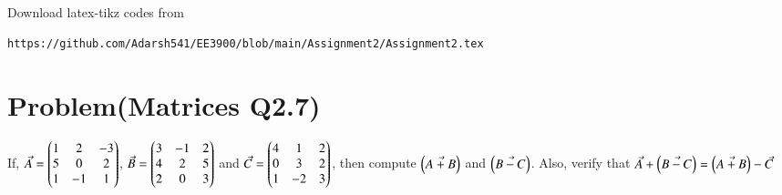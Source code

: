 \documentclass[journal,12pt,twocolumn]{IEEEtran}
\begin{document}
%
Download latex-tikz codes from 
%
\begin{lstlisting}
https://github.com/Adarsh541/EE3900/blob/main/Assignment2/Assignment2.tex
\end{lstlisting}
\section{Problem(Matrices Q2.7)}
If, $\Vec{A}=\begin{pmatrix}1&2&-3\\5&0&2\\1&-1&1\end{pmatrix}$, $\Vec{B}=\begin{pmatrix}3&-1&2\\4&2&5\\2&0&3\end{pmatrix}$ and $\Vec{C}=\begin{pmatrix}4&1&2\\0&3&2\\1&-2&3\end{pmatrix}$, then compute $\left(\Vec{A+B}\right)$ and $\left(\Vec{B-C}\right)$. Also, verify that $\Vec{A}+\left(\Vec{B-C}\right)=\left(\Vec{A+B}\right)-\Vec{C}$
\end{document}
